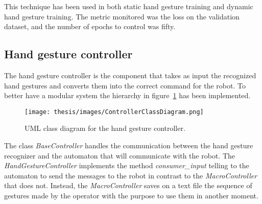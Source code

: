 \documentclass[../thesis.tex]{subfiles}
\begin{document}
This technique has been used in both static hand gesture training and dynamic hand gesture training. The metric monitored was the loss on the validation dataset, and the number of epochs to control was fifty.

\subsection{Hand gesture controller}\label{ss:hand_gesture_controller}
The hand gesture controller is the component that takes as input the recognized hand gestures and converts them into the correct command for the robot. To better have a modular system the hierarchy in figure~\ref{fig:controller-class-diagram} has been implemented.

\begin{figure}[H]
    \centering
    \texttt{[image: thesis/images/ControllerClassDiagram.png]}
    \caption{UML class diagram for the hand gesture controller.}
    \label{fig:controller-class-diagram}
\end{figure}

The class \textit{BaseController} handles the communication between the hand gesture recognizer and the automaton that will communicate with the robot. The \textit{HandGestureController} implements the method \textit{consumer\_input} telling to the automaton to send the messages to the robot in contrast to the \textit{MacroController} that does not. Instead, the \textit{MacroController} saves on a text file the sequence of gestures made by the operator with the purpose to use them in another moment.
\end{document}
